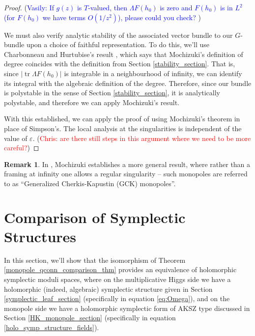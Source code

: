 \documentclass[11pt, oneside, reqno]{amsart}
\theoremstyle{definition} \newtheorem{definition}{Definition}[section]
\theoremstyle{definition} \newtheorem{remark}[definition]{Remark}
\theoremstyle{definition} \newtheorem{remarks}[definition]{Remarks}
\theoremstyle{definition} \newtheorem{question}[definition]{Question}
\theoremstyle{definition} \newtheorem*{note}{Note}
\theoremstyle{definition} \newtheorem{example}[definition]{Example}
\theoremstyle{definition} \newtheorem{examples}[definition]{Examples}
\newcommand{\eps}{\varepsilon}
\DeclareMathOperator{\tr}{tr}
\newcommand{\chris}[1]{(\textcolor{red}{Chris: #1})}
\newcommand{\vasily}[1]{(\textcolor{blue}{Vasily: #1})}
\begin{document}
\begin{proof}
\vasily{If $g(z)$ is $T$-valued, then $\Lambda F(h_0)$ is zero and $ F(h_0)$ is in $L^2$ (for $F(h_0)$ we have terms $O(1/z^2)$), please could you check?  } 

We must also verify analytic stability of the associated vector bundle to our $G$-bundle upon a choice of faithful representation.  To do this, we'll use Charbonneau and Hurtubise's result \cite[Lemma 4.5]{CharbonneauHurtubise}, which says that Mochizuki's definition of degree coincides with the definition from Section \ref{stability_section}.  That is, since $|\tr \Lambda F(h_0)|$ is integrable in a neighbourhood of infinity, we can identify its integral with the algebraic definition of the degree.  Therefore, since our bundle is polystable in the sense of Section \ref{stability_section}, it is analytically polystable, and therefore we can apply Mochizuki's result.

With this established, we can apply the proof of \cite[Proposition 5.2]{Smith} using Mochizuki's theorem in place of Simpson's.  The local analysis at the singularities is independent of the value of $\eps$.
\chris{are there still steps in this argument where we need to be more careful?}
\end{proof}

\begin{remark}
In \cite{Mochizuki}, Mochizuki establishes a more general result, where rather than a framing at infinity one allows a regular singularity -- such monopoles are referred to as ``Generalized Cherkis-Kapustin (GCK) monopoles''.
\end{remark}

\section{Comparison of Symplectic Structures} \label{symp_comparison_section}

In this section, we'll show that the isomorphism of Theorem \ref{monopole_qconn_comparison_thm} provides an equivalence of holomorphic symplectic moduli spaces, where on the multiplicative Higgs side we have a holomorphic (indeed, algebraic) symplectic structure given in Section \ref{symplectic_leaf_section} (specifically in equation \ref{eq:Omega}), and on the monopole side we have a holomorphic symplectic form of AKSZ type discussed in Section \ref{HK_monopole_section} (specifically in equation \ref{holo_symp_structure_fields}).
\end{document}
